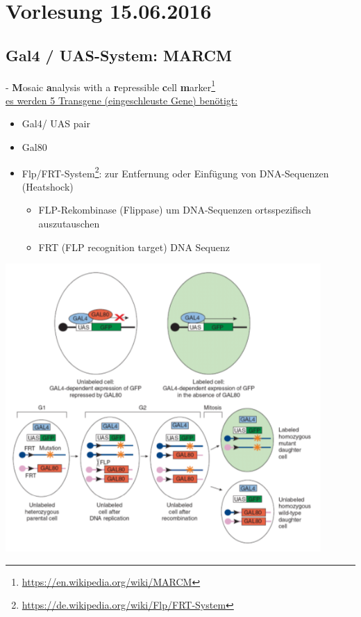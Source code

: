 \section{Vorlesung 15.06.2016}

\subsection{Gal4 / UAS-System: MARCM}
 - \textbf{M}osaic \textbf{a}nalysis with a \textbf{r}epressible \textbf{c}ell \textbf{m}arker\footnote{\url{https://en.wikipedia.org/wiki/MARCM}}\\

\underline{es werden 5 Transgene (eingeschleuste Gene) benötigt:}
\begin{itemize}
	\item Gal4/ UAS pair
	\item Gal80
	\item Flp/FRT-System\footnote{\url{https://de.wikipedia.org/wiki/Flp/FRT-System}}: zur Entfernung oder Einfügung von DNA-Sequenzen (Heatshock)
		\begin{itemize}
			\item FLP-Rekombinase (Flippase) um DNA-Sequenzen ortsspezifisch auszutauschen
			\item FRT (FLP recognition target) DNA Sequenz
		\end{itemize}
\end{itemize}

\includegraphics[width=0.9\textwidth]{lectures/160615/pix/marcm.png}

